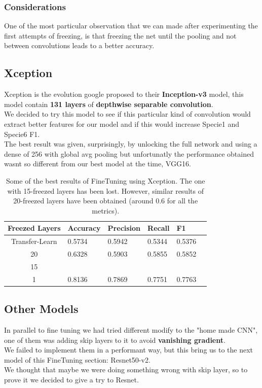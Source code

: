\documentclass[10pt]{article}
\begin{document}
\subsubsection{Considerations}
One of the most particular observation that we can made after experimenting the first attempts of freezing, is that freezing the net
until the pooling and not between convolutions leads to a better accuracy.

\subsection{Xception}
Xception is the evolution google proposed to their \textbf{Inception-v3} model, this model contain \textbf{131 layers} of \textbf{depthwise separable convolution}.\\
We decided to try this model to see if this particular kind of convolution would extract better features for our model and if this would increase Specie1 and Specie6 F1.\\
The best result was given, surprisingly, by unlocking the full network and using a dense of 256 with global avg pooling but
unfortunatly the performance obtained wasnt so different from our best model at the time, VGG16.

\begin{table}[ht]
  \centering
  \begin{adjustbox}{width=240}
  \small
  \begin{tabular}{|c|l|l|l|l|l}
  
  \hline \bf Freezed Layers & \bf Accuracy & \bf Precision & \bf Recall & \bf F1 \\ \hline
  Transfer-Learn & 0.5734 & 0.5942 & 0.5344 & 0.5376\\
  20 & 0.6328 & 0.5903 & 0.5855 & 0.5852\\
  15 &  &  &  & \\
  1 & 0.8136 & 0.7869 & 0.7751 & 0.7763\\
  \hline
  \end{tabular}
  \end{adjustbox}
  \caption{Some of the best results of FineTuning using Xception. The one with 15-freezed layers has been lost. However, similar results of 20-freezed layers have been obtained (around 0.6 for all the metrics).}
  \end{table}
\subsection{Other Models}
In parallel to fine tuning we had tried different modify to the "home made CNN", one of them was adding skip layers to it to avoid \textbf{vanishing gradient}.\\
We failed to implement them in a performant way, but this bring us to the next model of this FineTuning section: Resnet50-v2.\\
We thought that maybe we were doing something wrong with skip layer, so to prove it we decided to give a try to Resnet.
\end{document}
